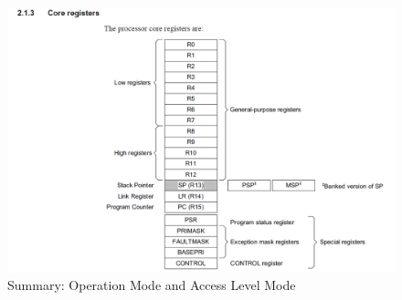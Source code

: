 \begin{figure}[h]
\centering
\includegraphics[scale=0.5]{Figures/ARM_Cortex/core_registers}
\caption{Summary: Operation Mode and Access Level Mode}
\label{fig:ARM_Cortex:core_registers}
\end{figure}

